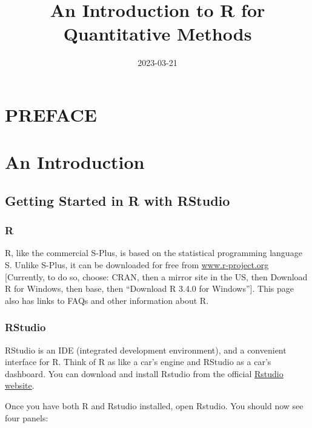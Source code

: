 \documentclass[
]{book}
\title{An Introduction to R for Quantitative Methods}
\author{}
\date{\vspace{-2.5em}2023-03-21}
\begin{document}
\maketitle

{
\setcounter{tocdepth}{1}
\tableofcontents
}
\hypertarget{preface}{%
\chapter*{PREFACE}\label{preface}}

\hypertarget{an-introduction}{%
\chapter{An Introduction}\label{an-introduction}}

\hypertarget{getting-started-in-r-with-rstudio}{%
\section*{Getting Started in R with RStudio}\label{getting-started-in-r-with-rstudio}}

\hypertarget{r}{%
\subsection*{R}\label{r}}

R, like the commercial S-Plus, is based on the statistical programming language S. Unlike S-Plus, it can be downloaded for free from \url{www.r-project.org} {[}Currently, to do so, choose: CRAN, then a mirror site in the US, then Download R for Windows, then base, then ``Download R 3.4.0 for Windows''{]}. This page also has links to FAQs and other information about R.

\hypertarget{rstudio}{%
\subsection*{RStudio}\label{rstudio}}

RStudio is an IDE (integrated development environment), and a convenient interface for R. Think of R as like a car's engine and RStudio as a car's dashboard. You can download and install Rstudio from the official \href{https://rstudio.com/products/rstudio/download/}{Rstudio website}.

Once you have both R and Rstudio installed, open Rstudio. You should now see four panels:
\end{document}
